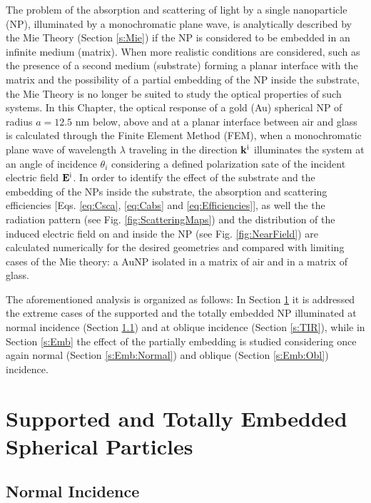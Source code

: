 \documentclass[11pt]{Latex/Classes/PhDthesisPSnPDF}
\begin{document}
    The problem of the absorption and scattering of light by a single nanoparticle (NP), illuminated by a monochromatic plane wave, is analytically described by the Mie Theory (Section \ref{s:Mie}) if the NP is considered to be embedded in an infinite medium (matrix). When more realistic conditions are considered, such as the presence of a second medium (substrate) forming a planar interface with the matrix and the possibility of a partial embedding of the NP inside the substrate, the Mie Theory is no longer be suited to study the optical properties of such systems. In this Chapter, the optical response of a gold (Au) spherical NP of radius $a = 12.5$ nm below, above and at a planar interface between air and glass is calculated through the Finite Element Method (FEM), when a monochromatic plane wave of wavelength $\lambda$ traveling in the direction $\vb{k}^\text{i}$ illuminates the system at an angle of incidence $\theta_i$ considering a defined polarization sate of the incident electric field $\vb{E}^\text{i}$. In order to identify the effect of the substrate and the embedding of the NPs inside the substrate, the absorption and scattering  efficiencies [Eqs. \eqref{eq:Csca}, \eqref{eq:Cabs} and \eqref{eq:Efficiencies}], as well the the radiation pattern (see Fig. \ref{fig:ScatteringMaps}) and the distribution of the induced electric field on and inside the NP (see Fig. \ref{fig:NearField}) are calculated numerically for the desired geometries and compared with limiting cases of the Mie theory: a AuNP isolated in a matrix of air and in a matrix of glass.

    The aforementioned analysis is organized as follows: In Section \ref{s:Totally} it is addressed the extreme cases of the supported and the totally embedded NP illuminated at normal incidence (Section \ref{s:Totally:Normal}) and at oblique incidence (Section \ref{s:TIR}), while in Section \ref{s:Emb} the effect of the partially embedding is studied considering once again  normal (Section \ref{s:Emb:Normal}) and oblique (Section \ref{s:Emb:Obl}) incidence.

    \section{Supported and Totally Embedded Spherical Particles}
     \label{s:Totally}
        

        \subsection{Normal Incidence}
        
         \label{s:Totally:Normal}
         
\end{document}
